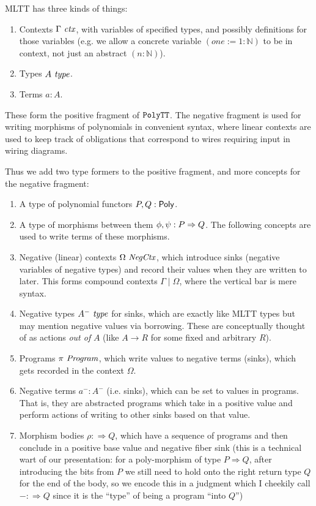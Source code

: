 \documentclass[final]{amsart}
\begin{document}
MLTT has three kinds of things:
\begin{enumerate}
  \item Contexts $\Gamma\, \operatorname{\mathit{ctx}}$, with variables of specified types, and possibly definitions for those variables (e.g. we allow a concrete variable $(one := 1 : \mathbb{N})$ to be in context, not just an abstract $(n : \mathbb{N})$).
  \item Types $A\, \operatorname{\mathit{type}}$.
  \item Terms $a : A$.
\end{enumerate}

These form the positive fragment of $\texttt{PolyTT}$.
The negative fragment is used for writing morphisms of polynomials in convenient syntax, where linear contexts are used to keep track of obligations that correspond to wires requiring input in wiring diagrams.

Thus we add two type formers to the positive fragment, and more concepts for the negative fragment:
\begin{enumerate}
  \item A type of polynomial functors $P, Q : \mathsf{Poly}$.
  \item A type of morphisms between them $\phi, \psi : P \Rightarrow Q$. The following concepts are used to write terms of these morphisms.
  \item Negative (linear) contexts $\Omega\ \mathit{NegCtx}$, which introduce sinks (negative variables of negative types) and record their values when they are written to later. This forms compound contexts $\Gamma \mid \Omega$, where the vertical bar is mere syntax.
  \item Negative types $A^{-}\, \operatorname{\mathit{type}}$ for sinks, which are exactly like MLTT types but may mention negative values via borrowing. These are conceptually thought of as actions \emph{out of} $A$ (like $A \to R$ for some fixed and arbitrary $R$).
  \item Programs $\pi\ \mathit{Program}$, which write values to negative terms (sinks), which gets recorded in the context $\Omega$.
  \item Negative terms $a^{-} : A^{-}$ (i.e. sinks), which can be set to values in programs. That is, they are abstracted programs which take in a positive value and perform actions of writing to other sinks based on that value.
  \item Morphism bodies $\rho :\Rightarrow Q$, which have a sequence of programs and then conclude in a positive base value and negative fiber sink (this is a technical wart of our presentation: for a poly-morphism of type $P \Rightarrow Q$, after introducing the bits from $P$ we still need to hold onto the right return type $Q$ for the end of the body, so we encode this in a judgment which I cheekily call $- :\Rightarrow Q$ since it is the ``type'' of being a program ``into $Q$'')
\end{enumerate}
\end{document}
